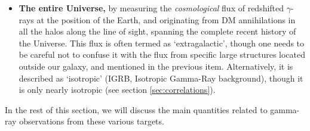 \begin{itemize}
the Virgo, Coma, Fornax, and Perseus clusters, as well as several others. 
In such larger objects the DM particles have  higher velocities on average, so that these are good probes of DM with velocity-suppressed $p$- or $d-$wave annihilations~\cite{2304.10301}.
\item[$\circ$] {\bf The entire Universe,} by measuring  the {\em cosmological} flux of redshifted $\gamma$-rays at the position of the Earth, and originating from DM annihilations in all the halos along the line of sight, spanning the complete recent history of the Universe. 
This flux is often termed as `extragalactic', though one needs to be careful not to confuse it 
with the flux from specific large structures located outside our galaxy, and mentioned in the previous item. 
Alternatively, it is described as `isotropic' (IGRB, Isotropic Gamma-Ray background), though it is only nearly isotropic (see section \ref{sec:correlations}). 
\end{itemize}
In the rest of this section,  we will discuss the main quantities related to gamma-ray observations from these various targets.

